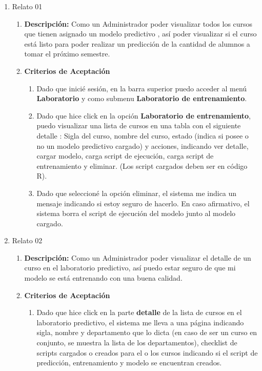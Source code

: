 \begin{enumerate}
	\item Relato 01
		\begin{enumerate}
			\item \textbf{Descripción:} Como un Administrador poder visualizar todos los cursos que tienen asignado un modelo predictivo , así poder visualizar si el curso está listo para poder realizar un predicción de la cantidad de alumnos a tomar el próximo semestre.
			\item \textbf{Criterios de Aceptación}
				\begin{enumerate}
					\item Dado que inicié sesión, en la barra superior puedo acceder al menú \textbf{Laboratorio} y como submenu \textbf{Laboratorio de entrenamiento}.
					\item Dado que hice click en la opción \textbf{Laboratorio de entrenamiento}, puedo visualizar una lista de cursos en una tabla con el siguiente detalle : Sigla del curso, nombre del curso, estado (indica si posee  o no un modelo predictivo cargado) y acciones, indicando ver detalle, cargar modelo, carga script de ejecución, carga script de entrenamiento y eliminar. (Los script cargados deben ser en código R).
					\item Dado que seleccioné la opción eliminar, el sistema me indica un mensaje indicando si estoy seguro de hacerlo. En caso afirmativo, el sistema borra el script de ejecución del modelo junto al modelo cargado.
				\end{enumerate}
		\end{enumerate}
	\item Relato 02
		\begin{enumerate}
			\item \textbf{Descripción:} Como un Administrador poder visualizar el detalle de un curso en el laboratorio predictivo, así puedo estar seguro de que mi modelo se está entrenando con una buena calidad.
			\item \textbf{Criterios de Aceptación}
				\begin{enumerate}
					\item Dado que hice click en la parte \textbf{detalle} de la lista de cursos en el laboratorio predictivo, el sistema me lleva a una página indicando sigla, nombre y departamento que lo dicta (en caso de ser un curso en conjunto, se muestra la lista de los departamentos), checklist de scripts cargados o creados para el o los cursos indicando si el script de predicción, entrenamiento y modelo se encuentran creados.

\end{enumerate}
\end{enumerate}
\end{enumerate}
